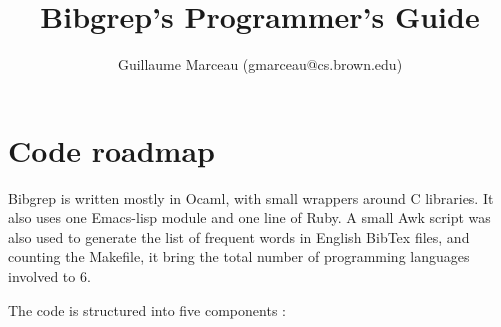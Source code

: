 \documentclass[11pt]{article}
\title{Bibgrep's Programmer's Guide}
\author{Guillaume Marceau (gmarceau@cs.brown.edu)}
\begin{document}
\maketitle

\section{Code roadmap}

Bibgrep is written mostly in Ocaml, with small wrappers around C
libraries. It also uses one Emacs-lisp module and one line of Ruby. A
small Awk script was also used to generate the list of frequent words
in English BibTex files, and counting the Makefile, it bring the total
number of programming languages involved to 6. 


The code is structured into five components :
\end{document}
